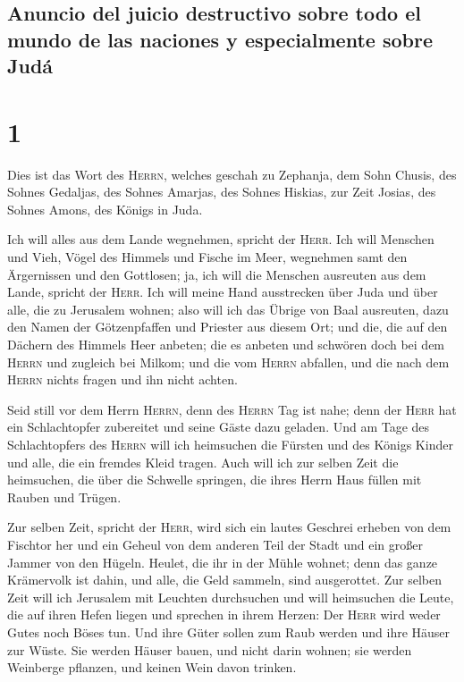 \hypertarget{anuncio-del-juicio-destructivo-sobre-todo-el-mundo-de-las-naciones-y-especialmente-sobre-juduxe1}{%
\subsection{Anuncio del juicio destructivo sobre todo el mundo de las
naciones y especialmente sobre
Judá}\label{anuncio-del-juicio-destructivo-sobre-todo-el-mundo-de-las-naciones-y-especialmente-sobre-juduxe1}}

\hypertarget{section}{%
\section{1}\label{section}}

 Dies ist das Wort des \textsc{Herrn}, welches geschah zu
Zephanja, dem Sohn Chusis, des Sohnes Gedaljas, des Sohnes Amarjas, des
Sohnes Hiskias, zur Zeit Josias, des Sohnes Amons, des Königs in Juda.

 Ich will alles aus dem Lande wegnehmen, spricht der
\textsc{Herr}.  Ich will Menschen und Vieh, Vögel des
Himmels und Fische im Meer, wegnehmen samt den Ärgernissen und den
Gottlosen; ja, ich will die Menschen ausreuten aus dem Lande, spricht
der \textsc{Herr}.  Ich will meine Hand ausstrecken über
Juda und über alle, die zu Jerusalem wohnen; also will ich das Übrige
von Baal ausreuten, dazu den Namen der Götzenpfaffen und Priester aus
diesem Ort;  und die, die auf den Dächern des Himmels Heer
anbeten; die es anbeten und schwören doch bei dem \textsc{Herrn} und
zugleich bei Milkom;  und die vom \textsc{Herrn} abfallen,
und die nach dem \textsc{Herrn} nichts fragen und ihn nicht achten.

 Seid still vor dem Herrn \textsc{Herrn}, denn des
\textsc{Herrn} Tag ist nahe; denn der \textsc{Herr} hat ein
Schlachtopfer zubereitet und seine Gäste dazu geladen. 
Und am Tage des Schlachtopfers des \textsc{Herrn} will ich heimsuchen
die Fürsten und des Königs Kinder und alle, die ein fremdes Kleid
tragen.  Auch will ich zur selben Zeit die heimsuchen, die
über die Schwelle springen, die ihres Herrn Haus füllen mit Rauben und
Trügen.

 Zur selben Zeit, spricht der \textsc{Herr}, wird sich
ein lautes Geschrei erheben von dem Fischtor her und ein Geheul von dem
anderen Teil der Stadt und ein großer Jammer von den Hügeln.
 Heulet, die ihr in der Mühle wohnet; denn das ganze
Krämervolk ist dahin, und alle, die Geld sammeln, sind ausgerottet.
 Zur selben Zeit will ich Jerusalem mit Leuchten
durchsuchen und will heimsuchen die Leute, die auf ihren Hefen liegen
und sprechen in ihrem Herzen: Der \textsc{Herr} wird weder Gutes noch
Böses tun.  Und ihre Güter sollen zum Raub werden und
ihre Häuser zur Wüste. Sie werden Häuser bauen, und nicht darin wohnen;
sie werden Weinberge pflanzen, und keinen Wein davon trinken.

